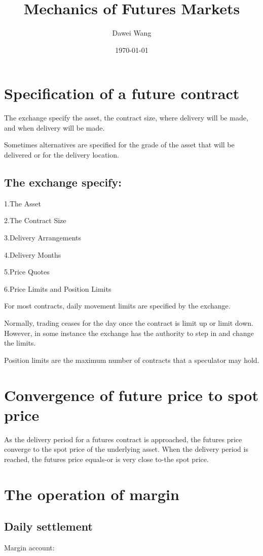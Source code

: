 \documentclass{article}
\title{Mechanics of Futures Markets}
\author{Dawei Wang}
\date{\today}
\begin{document}
	\maketitle
\section{Specification of a future contract}
The exchange specify the asset, the contract size, where delivery will be made, and when delivery will be made.

Sometimes alternatives are specified for the grade of the asset that will be delivered or for the delivery location.
\\ \hspace*{\fill}
\subsection{The exchange specify:}
1.The Asset

2.The Contract Size

3.Delivery Arrangements

4.Delivery Months

5.Price Quotes

6.Price Limits and Position Limits
\\ \hspace*{\fill}

For most contracts, daily movement limits are specified by the exchange. 

Normally, trading ceases for the day once the contract is limit up or limit down. However, in some instance the exchange  has the authority to step in and change the limits.

Position limits are the maximum number of contracts that a speculator may hold.

\section{Convergence of future price to spot price}
As the delivery period for a futures contract is approached, the futures price converge to the spot price of the underlying asset. When the delivery period is reached, the futures price equals-or is very close to-the spot price.

\section{The operation of margin}
\subsection{Daily settlement}
Margin account:
\end{document}
